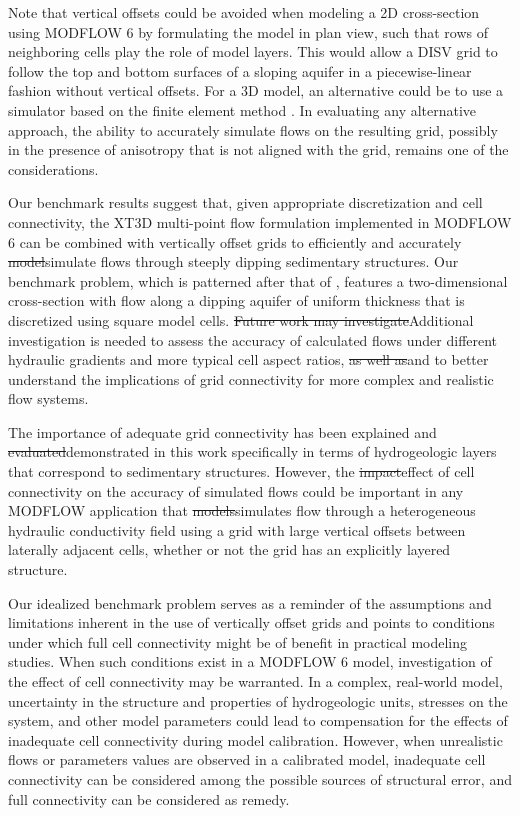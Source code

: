 \documentclass{article}
\begin{document}
{\color{red} Note that vertical offsets could be avoided when modeling a 2D cross-section using MODFLOW 6 by formulating the model in plan view, such that rows of neighboring cells play the role of model layers. This would allow a DISV grid to follow the top and bottom surfaces of a sloping aquifer in a piecewise-linear fashion without vertical offsets. For a 3D model, an alternative could be to use a simulator based on the finite element method \citep[see, e.g.,][]{yager2009anisotropy}. In evaluating any alternative approach, the ability to accurately simulate flows on the resulting grid, possibly in the presence of anisotropy that is not aligned with the grid, remains one of the considerations.}

Our benchmark results suggest that, given appropriate discretization and cell connectivity, the XT3D multi-point flow formulation implemented in MODFLOW 6 can be combined with vertically offset grids to efficiently and accurately {\color{red} \sout{model}simulate} flows through steeply dipping sedimentary structures. {\color{red} Our benchmark problem, which is patterned after that of \cite{bardot2023}, features a two-dimensional cross-section with flow along a dipping aquifer of uniform thickness that is discretized using square model cells.} {\color{red} \sout{Future work may investigate}Additional investigation is needed to assess} the accuracy of calculated flows under different hydraulic gradients {\color{red} and more typical cell aspect ratios}, {\color{red} \sout{as well as}and to better understand} the implications of grid connectivity for more complex and realistic flow systems.

The importance of adequate grid connectivity has been explained and {\color{red} \sout{evaluated}demonstrated} in this work specifically in terms of hydrogeologic layers that correspond to sedimentary structures. However, the {\color{red} \sout{impact}effect} of cell connectivity on the accuracy of simulated flows could be important in any MODFLOW application that {\color{red} \sout{models}simulates} flow through a heterogeneous hydraulic conductivity field using a grid with large vertical offsets between laterally adjacent cells, whether or not the grid has an explicitly layered structure. 

{\color{red} Our idealized benchmark problem serves as a reminder of the assumptions and limitations inherent in the use of vertically offset grids and points to conditions under which full cell connectivity might be of benefit in practical modeling studies. When such conditions exist in a MODFLOW 6 model, investigation of the effect of cell connectivity may be warranted. In a complex, real-world model, uncertainty in the structure and properties of hydrogeologic units, stresses on the system, and other model parameters could lead to compensation for the effects of inadequate cell connectivity during model calibration. However, when unrealistic flows or parameters values are observed in a calibrated model, inadequate cell connectivity can be considered among the possible sources of structural error, and full connectivity can be considered as remedy.}
\end{document}
